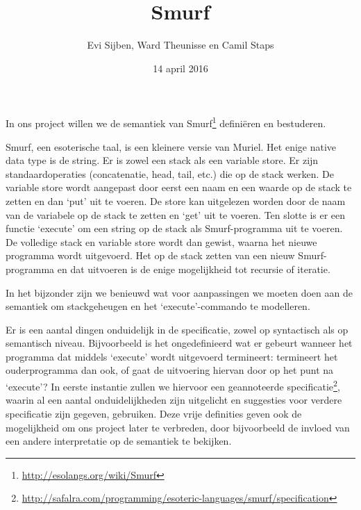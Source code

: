 \documentclass[a4paper]{article}
\title{Smurf}
\author{Evi Sijben, Ward Theunisse en Camil Staps}
\date{14 april 2016}
\begin{document}
\maketitle

In ons project willen we de semantiek van
Smurf\footnote{\url{http://esolangs.org/wiki/Smurf}}
defini\"eren en bestuderen.

Smurf, een esoterische taal, is een kleinere versie van Muriel. Het enige
native data type is de string. Er is zowel een stack als een variable store.
Er zijn standaardoperaties (concatenatie, head, tail, etc.) die op de stack
werken. De variable store wordt aangepast door eerst een naam en een waarde op
de stack te zetten en dan `put' uit te voeren. De store kan uitgelezen worden
door de naam van de variabele op de stack te zetten en `get' uit te voeren.
Ten slotte is er een functie `execute' om een string op de stack als
Smurf-programma uit te voeren. De volledige stack en variable store wordt dan 
gewist, waarna het nieuwe programma wordt uitgevoerd. Het op de stack zetten
van een nieuw Smurf-programma en dat uitvoeren is de enige mogelijkheid tot
recursie of iteratie.

In het bijzonder zijn we benieuwd wat voor aanpassingen we moeten doen aan de
semantiek om stackgeheugen en het `execute'-commando te modelleren.

Er is een aantal dingen onduidelijk in de specificatie, zowel op syntactisch
als op semantisch niveau. Bijvoorbeeld is het ongedefinieerd wat er gebeurt
wanneer het programma dat middels `execute' wordt uitgevoerd termineert:
termineert het ouderprogramma dan ook, of gaat de uitvoering hiervan door op
het punt na `execute'? In eerste instantie zullen we hiervoor een geannoteerde
specificatie\footnote{\url{http://safalra.com/programming/esoteric-languages/smurf/specification}},
waarin al een aantal onduidelijkheden zijn uitgelicht en suggesties voor
verdere specificatie zijn gegeven, gebruiken. Deze vrije definities geven
ook de mogelijkheid om ons project later te verbreden, door bijvoorbeeld de
invloed van een andere interpretatie op de semantiek te bekijken.
\end{document}
